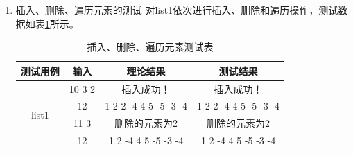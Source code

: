 \documentclass[supercite]{Experimental_Report}
\theoremstyle{definition}
\begin{document}
\begin{enumerate}
	\item 插入、删除、遍历元素的测试
	对list1依次进行插入、删除和遍历操作，测试数据如表\ref{table3}所示。
	\begin{table}
		\begin{center}
		\setlength{\tabcolsep}{2.0mm}
		\caption{插入、删除、遍历元素测试表}
		\label{table3}
			\begin{tabular}{c|c|c|c}
			\hline
			测试用例    			     & 输入               & 理论结果         & 测试结果\\
			\hline
			\hline			
			\multirow{4}{*}{list1}   	& 10 3 2           	 & 插入成功！       & 插入成功！\\
										& 12		         & 1 2 2 -4 4 5 -5 -3 -4  & 1 2 2 -4 4 5 -5 -3 -4\\
										& 11 3             	 & 删除的元素为2    & 删除的元素为2\\
										& 12			     & 1 2 -4 4 5 -5 -3 -4   & 1 2 -4 4 5 -5 -3 -4\\
			\hline
			\end{tabular}
		\end{center}
	\end{table}


\end{enumerate}
\end{document}

